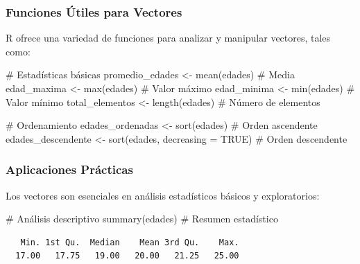 \documentclass[
  spanish,
  a4paper,
  DIV=11,
  numbers=noendperiod,
  onepage,
  openany]{scrreprt}
\newenvironment{Shaded}{\begin{snugshade}}{\end{snugshade}}
\newcommand{\AttributeTok}[1]{\textcolor[rgb]{0.40,0.45,0.13}{#1}}
\newcommand{\CommentTok}[1]{\textcolor[rgb]{0.37,0.37,0.37}{#1}}
\newcommand{\ConstantTok}[1]{\textcolor[rgb]{0.56,0.35,0.01}{#1}}
\newcommand{\FunctionTok}[1]{\textcolor[rgb]{0.28,0.35,0.67}{#1}}
\newcommand{\NormalTok}[1]{\textcolor[rgb]{0.00,0.23,0.31}{#1}}
\newcommand{\OtherTok}[1]{\textcolor[rgb]{0.00,0.23,0.31}{#1}}
\begin{document}
\subsubsection{Funciones Útiles para
Vectores}\label{funciones-uxfatiles-para-vectores}

R ofrece una variedad de funciones para analizar y manipular vectores,
tales como:

\begin{Shaded}
\begin{Highlighting}[]
\CommentTok{\# Estadísticas básicas}
\NormalTok{promedio\_edades }\OtherTok{\textless{}{-}} \FunctionTok{mean}\NormalTok{(edades)       }\CommentTok{\# Media}
\NormalTok{edad\_maxima }\OtherTok{\textless{}{-}} \FunctionTok{max}\NormalTok{(edades)            }\CommentTok{\# Valor máximo}
\NormalTok{edad\_minima }\OtherTok{\textless{}{-}} \FunctionTok{min}\NormalTok{(edades)            }\CommentTok{\# Valor mínimo}
\NormalTok{total\_elementos }\OtherTok{\textless{}{-}} \FunctionTok{length}\NormalTok{(edades)      }\CommentTok{\# Número de elementos}

\CommentTok{\# Ordenamiento}
\NormalTok{edades\_ordenadas }\OtherTok{\textless{}{-}} \FunctionTok{sort}\NormalTok{(edades)      }\CommentTok{\# Orden ascendente}
\NormalTok{edades\_descendente }\OtherTok{\textless{}{-}} \FunctionTok{sort}\NormalTok{(edades, }\AttributeTok{decreasing =} \ConstantTok{TRUE}\NormalTok{)  }\CommentTok{\# Orden descendente}
\end{Highlighting}
\end{Shaded}

\subsubsection{Aplicaciones Prácticas}\label{aplicaciones-pruxe1cticas}

Los vectores son esenciales en análisis estadísticos básicos y
exploratorios:

\begin{Shaded}
\begin{Highlighting}[]
\CommentTok{\# Análisis descriptivo}
\FunctionTok{summary}\NormalTok{(edades)  }\CommentTok{\# Resumen estadístico}
\end{Highlighting}
\end{Shaded}

\begin{verbatim}
   Min. 1st Qu.  Median    Mean 3rd Qu.    Max. 
  17.00   17.75   19.00   20.00   21.25   25.00 
\end{verbatim}
\end{document}
